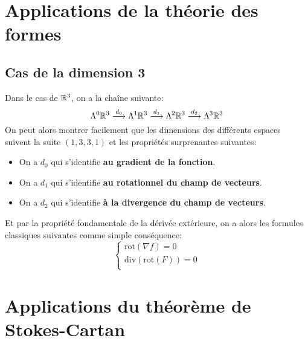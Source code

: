 \chapter{Applications de la théorie des formes}
   \section{Cas de la dimension 3}
   Dans le cas de \(\mathbb{R}^3\), on a la chaîne suivante:
   \[
      \Lambda^0 \mathbb{R}^3 \overset{d_0}{\longrightarrow} \Lambda^1 \mathbb{R}^3 \overset{d_1}{\longrightarrow} \Lambda^2 \mathbb{R}^3 \overset{d_2}{\longrightarrow} \Lambda^3 \mathbb{R}^3
   \]
   On peut alors montrer facilement que les dimensions des différents espaces suivent la suite \((1, 3, 3, 1)\) et les propriétés surprenantes suivantes:
   \begin{itemize}
      \item On a \(d_0\) qui s'identifie \textbf{au gradient de la fonction}.
      \item On a \(d_1\) qui s'identifie \textbf{au rotationnel du champ de vecteurs}.
      \item On a \(d_2\) qui s'identifie \textbf{à la divergence du champ de vecteurs}.
   \end{itemize}
   Et par la propriété fondamentale de la dérivée extérieure, on a alors les formules classiques suivantes comme simple conséquence:
   \[
      \begin{cases}
         \text{rot}(\nabla f) = 0\\
         \text{div}(\text{rot}(F)) = 0\\
      \end{cases}
   \]


\chapter{Applications du théorème de Stokes-Cartan}
